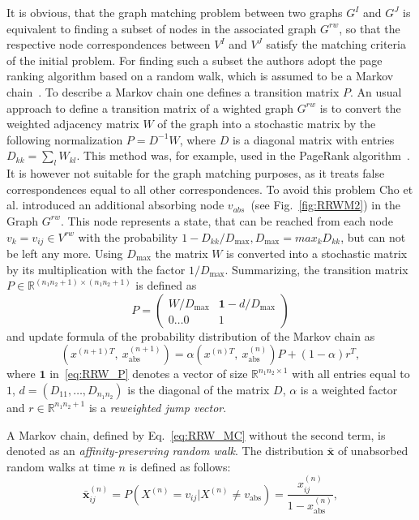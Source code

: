 It is obvious, that the graph matching problem between two graphs $G^I$ and $G^J$ is equivalent to finding a subset of nodes in the associated graph $G^{rw}$, so that the respective node correspondences between $V^I$ and $V^J$ satisfy the matching criteria of the initial problem.
For finding such a subset the authors adopt the page ranking algorithm based on a random walk, which is assumed to be a Markov chain~\cite{PageRank}. To describe a Markov chain one defines a transition matrix $P$. An usual approach to define a transition matrix of a wighted graph $G^{rw}$ is to convert the weighted adjacency matrix $W$ of the graph into a stochastic matrix by the following normalization $P=D^{-1}W$, where $D$ is a diagonal matrix with entries $D_{kk}=\sum_{l}{W_{kl}}$. This method was, for example, used in the PageRank algorithm~\cite{PageRank}. It is however not suitable for the graph matching purposes, as it treats false correspondences equal to all other correspondences. To avoid this problem Cho et al. introduced an additional absorbing node $v_{abs}$~(see Fig.~\ref{fig:RRWM2}) in the Graph $G^{rw}$. This node represents a state, that can be reached from each node $v_k=v_{ij}\in V^{rw}$ with the probability $1-D_{kk}/D_{\text{max}}, D_{\text{max}}=max_{k}D_{kk}$, but can not be left any more. Using $D_\text{max}$ the matrix $W$ is converted into a stochastic matrix by its multiplication with the factor $1/D_{\text{max}}$.
Summarizing, the transition matrix $P\in\mathbb{R}^{(n_1n_2+1)\times(n_1n_2+1)}$ is defined as 
\begin{equation}P=
\begin{pmatrix}
W/D_{\text{max}} & \mathbf{1}-d/D_{\text{max}} \\
0\dots 0 & 1
\end{pmatrix} \label{eq:RRW_P}
\end{equation}
and update formula of the probability distribution of the Markov chain as
\begin{equation}\label{eq:RRW_MC}
\left(x^{(n+1)T},\ x_{\text{abs}}^{(n+1)}\right)=\alpha\left(x^{(n)T},\ x_{\text{abs}}^{(n)}\right)P+(1-\alpha)r^T,
\end{equation}
where $\mathbf{1}$ in~\eqref{eq:RRW_P} denotes a vector of size $\mathbb{R}^{n_1n_2\times 1}$ with all entries equal to $1$, $d=(D_{11},\dots,D_{n_1n_2})$ is the diagonal of the matrix $D$, $\alpha$ is a weighted factor and $r\in\mathbb{R}^{n_1n_2+1}$ is a \emph{reweighted jump vector}.

A Markov chain, defined by Eq.~\ref{eq:RRW_MC} without the second term, is denoted as an \emph{affinity-preserving random walk}. The distribution $\mathbf{\bar{x}}$ of unabsorbed random walks at time $n$ is defined as follows:
\begin{equation}\label{eq:RRWM_x}
\mathbf{\bar{x}}^{(n)}_{ij}=P(X^{(n)}=v_{ij}|X^{(n)}\not=v_{\text{abs}})=\frac{x^{(n)}_{ij}}{1-x^{(n)}_{\text{abs}}}, 
\end{equation}

